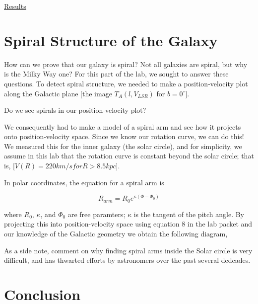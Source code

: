 \documentclass[12pt,preprint]{aastex}
\begin{document}
\underline{Results}

\section{Spiral Structure of the Galaxy}

How can we prove that our galaxy is spiral? Not all galaxies are spiral,
but why is the Milky Way one? For this part of the lab, we sought to
answer these questions. To detect spiral structure, we needed to make a
position-velocity plot along the Galactic plane [the image
  $T_{A}(l,V_{LSR})$ for $b=0^{\circ}$]. 

Do we see spirals in our position-velocity plot?

We consequently had to make a model of a spiral arm and see how it
projects onto position-velocity space. Since we know our rotation curve,
we can do this! We measured this for the inner galaxy (the solar
circle), and for simplicity, we assume in this lab that the rotation
curve is constant beyond the  solar circle; that is, [$V(R)=220 km/s for
  R>8.5kpc$].

In polar coordinates, the equation for a spiral arm is

\begin{equation}
R_{arm} = R_{0}e^{\kappa(\Phi-\Phi_{0})}
\end{equation}

where $R_{0}$, $\kappa$, and $\Phi_{0}$ are free paramters; $\kappa$ is
the tangent of the pitch angle. By projecting this into
position-velocity space using equation 8 in the lab packet and our knowledge of the
Galactic geometry we obtain the following diagram,


As a side note, comment on why finding spiral arms inside the Solar
circle is very difficult, and has thwarted efforts by astronomers over
the past several dedcades. 

\section{Conclusion}
\end{document}
